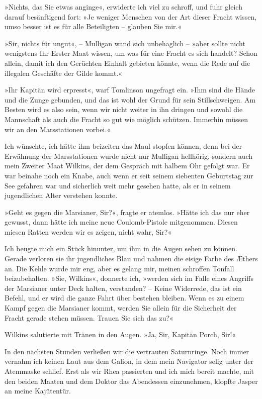 »Nichts, das Sie etwas anginge«, erwiderte ich viel zu schroff, und
fuhr gleich darauf besänftigend fort: »Je weniger Menschen von der
Art dieser Fracht wissen, umso besser ist es für alle Beteiligten –
glauben Sie mir.«

»Sir, nichts für ungut«, – Mulligan wand sich unbehaglich – »aber
sollte nicht wenigstens Ihr Erster Maat wissen, um was für eine
Fracht es sich handelt? Schon allein, damit ich den Gerüchten
Einhalt gebieten könnte, wenn die Rede auf die illegalen Geschäfte
der Gilde kommt.«

»Ihr Kapitän wird erpresst«, warf Tomlinson ungefragt ein. »Ihm
sind die Hände und die Zunge gebunden, und das ist wohl der Grund
für sein Stillschweigen. Am Besten wird es also sein, wenn wir
nicht weiter in ihn dringen und sowohl die Mannschaft als auch die
Fracht so gut wie möglich schützen. Immerhin müssen wir an den
Marsstationen vorbei.«

Ich wünschte, ich hätte ihm beizeiten das Maul stopfen können, denn
bei der Erwähnung der Marsstationen wurde nicht nur Mulligan
hellhörig, sondern auch mein Zweiter Maat Wilkins, der dem Gespräch
mit halbem Ohr gefolgt war. Er war beinahe noch ein Knabe, auch
wenn er seit seinem siebenten Geburtstag zur See gefahren war und
sicherlich weit mehr gesehen hatte, als er in seinem jugendlichen
Alter verstehen konnte.

»Geht es gegen die Marsianer, Sir?«, fragte er atemlos. »Hätte ich
das nur eher gewusst, dann hätte ich meine neue Coulomb-Pistole
mitgenommen. Diesen miesen Ratten werden wir es zeigen, nicht wahr,
Sir?«

Ich beugte mich ein Stück hinunter, um ihm in die Augen sehen zu
können. Gerade verloren sie ihr jugendliches Blau und nahmen die
eisige Farbe des Æthers an. Die Kehle wurde mir eng, aber es gelang
mir, meinen schroffen Tonfall beizubehalten. »Sie, Wilkins«,
donnerte ich, »werden sich im Falle eines Angriffs der Marsianer
unter Deck halten, verstanden? – Keine Widerrede, das ist ein
Befehl, und er wird die ganze Fahrt über bestehen bleiben. Wenn es
zu einem Kampf gegen die Marsianer kommt, werden Sie allein für die
Sicherheit der Fracht gerade stehen müssen. Trauen Sie sich das
zu?«

Wilkins salutierte mit Tränen in den Augen. »Ja, Sir, Kapitän
Porch, Sir!«

\bigpar

In den nächsten Stunden verließen wir die vertrauten Saturnringe.
Noch immer vernahm ich keinen Laut aus dem Galion, in dem mein
Navigator selig unter der Atemmaske schlief. Erst als wir Rhea
passierten und ich mich bereit machte, mit den beiden Maaten und
dem Doktor das Abendessen einzunehmen, klopfte Jasper an meine
Kajütentür.

